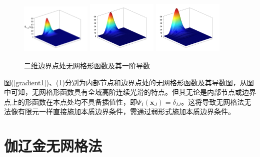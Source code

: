 \begin{figure}[H]
\begin{subcaptiongroup}
    \end{subcaptiongroup}
    \begin{subcaptiongroup}
        \includegraphics[width=0.3\textwidth]{figure/nomesh/QD77/5.png}
        \includegraphics[width=0.3\textwidth]{figure/nomesh/C77/5.png}
        \includegraphics[width=0.3\textwidth]{figure/nomesh/QT77/5.png}
    \end{subcaptiongroup}
\caption{二维边界点处无网格形函数及其一阶导数}\label{gradient2}
\end{figure}
图(\ref{gradient1})、(\ref{gradient2})分别为内部节点和边界点处的无网格形函数及其导数图，从图中可知，无网格形函数具有全域高阶连续光滑的特点。但其无论是内部节点或边界点上的形函数在本点处均不具备插值性，即$\Psi_I(\pmb{x}_J)=\delta_{IJ}$。这将导致无网格法无法像有限元一样直接施加本质边界条件，需通过弱形式施加本质边界条件。
\newpage
\section{伽辽金无网格法}
